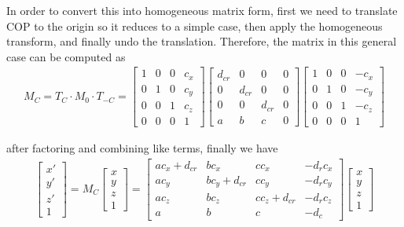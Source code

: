 \documentclass[11pt]{article}  %
\begin{document}
    In order to convert this into homogeneous matrix form, first we need to translate COP to the origin so it reduces to a simple case, then apply the homogeneous transform, and finally undo the translation. Therefore, the matrix in this general case can be computed as
    \begin{align*}
        M_C = T_C \cdot M_0 \cdot T_{-C}=
        \begin{bmatrix}
            1 & 0 & 0 & c_x\\
            0 & 1 & 0 & c_y\\
            0 & 0 & 1 & c_z\\
            0 & 0 & 0 & 1
        \end{bmatrix}
        \begin{bmatrix}
            d_{cr} & 0 & 0 & 0\\
            0 & d_{cr} & 0 & 0\\
            0 & 0 & d_{cr} & 0\\
            a & b & c & 0
        \end{bmatrix}
        \begin{bmatrix}
            1 & 0 & 0 & -c_x\\
            0 & 1 & 0 & -c_y\\
            0 & 0 & 1 & -c_z\\
            0 & 0 & 0 & 1
        \end{bmatrix}
    \end{align*}
    
    after factoring and combining like terms, finally we have \vspace{1mm}
    \begin{align*}
        \begin{bmatrix}
            x'\\y'\\z'\\1
        \end{bmatrix}
        =M_C
        \begin{bmatrix}
            x\\y\\z\\1
        \end{bmatrix}
        =
        \begin{bmatrix}
            ac_x+d_{cr} & bc_x        & cc_x        & -d_rc_x\\
            ac_y        & bc_y+d_{cr} & cc_y        & -d_rc_y\\
            ac_z        & bc_z        & cc_z+d_{cr} & -d_rc_z\\
            a           & b           & c           & -d_c
        \end{bmatrix}
        \begin{bmatrix}
            x\\y\\z\\1
        \end{bmatrix}
    \end{align*}\vspace{1mm}
    
\end{document}
